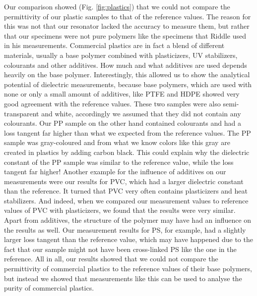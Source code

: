 Our comparison showed (Fig. \ref{fig:plastics}) that we could not compare the permittivity of our plastic samples to that of the reference values. The reason for this was not that our resonator lacked the accuracy to measure them, but rather that our specimens were not pure polymers like the specimens that Riddle used in his measurements. Commercial plastics are in fact a blend of different materials, usually a base polymer combined with plasticizers, UV stabilizers, colourants and other additives. How much and what additives are used depends heavily on the base polymer. Interestingly, this allowed us to show the analytical potential of dielectric measurements, because base polymers, which are used with none or only a small amount of additives, like PTFE and HDPE showed very good agreement with the reference values. These two samples were also semi-transparent and white, accordingly we assumed that they did not contain any colourants. Our PP sample on the other hand contained colourants and had a loss tangent far higher than what we expected from the reference values. The PP sample was gray-coloured and from what we know colors like this gray are created in plastics by adding carbon black. This could explain why the dielectric constant of the PP sample was similar to the reference value, while the loss tangent far higher! Another example for the influence of additives on our measurements were our results for PVC, which had a larger dielectric constant than the reference. It turned that PVC very often contains plasticizers and heat stabilizers. And indeed, when we compared our measurement values to reference values of PVC with plasticizers, we found that the results were very similar. Apart from additives, the structure of the polymer may have had an influence on the results as well. Our measurement results for PS, for example, had a slightly larger loss tangent than the reference value, which may have happened due to the fact that our sample might not have been cross-linked PS like the one in the reference. All in all, our results showed that we could not compare the permittivity of commercial plastics to the reference values of their base polymers, but instead we showed that measurements like this can be used to analyse the purity of commercial plastics.
